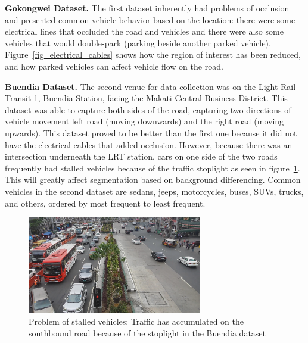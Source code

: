 \documentclass[conference]{IEEEtran}
\begin{document}
\textbf{Gokongwei Dataset.} The first dataset inherently had problems of occlusion and presented common vehicle behavior based on the location: there were some electrical lines that occluded the road and vehicles and there were also some vehicles that would double-park (parking beside another parked vehicle). Figure~\ref{fig_electrical_cables} shows how the region of interest has been reduced, and how parked vehicles can affect vehicle flow on the road.

\textbf{Buendia Dataset.} The second venue for data collection was on the Light Rail Transit 1, Buendia Station, facing the Makati Central Business District. This dataset was able to capture both sides of the road, capturing two directions of vehicle movement left road (moving downwards) and the right road (moving upwards). This dataset proved to be better than the first one because it did not have the electrical cables that added occlusion. However, because there was an intersection underneath the LRT station, cars on one side of the two roads frequently had stalled vehicles because of the traffic stoplight as seen in figure~\ref{fig_traffic}. This will greatly affect segmentation based on background differencing. Common vehicles in the second dataset are sedans, jeeps, motorcycles, buses, SUVs, trucks, and others, ordered by most frequent to least frequent.


\begin{figure}[!h]
\centering
\includegraphics[width=3in]{dataset2_sample.png}
\caption{Problem of stalled vehicles: Traffic has accumulated on the southbound road because of the stoplight in the Buendia dataset}
\label{fig_traffic}
\end{figure}
\end{document}
